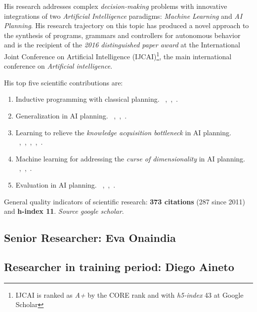 \documentclass[10pt,a4paper]{paper}
\begin{document}
His research addresses complex {\em decision-making} problems with innovative integrations of two {\em Artificial Intelligence} paradigms: {\em Machine Learning} and {\em AI Planning}. His research trajectory on this topic has produced a novel approach to the synthesis of programs, grammars and controllers for autonomous behavior and is the recipient of the {\it 2016 distinguished paper award} at the International Joint Conference on Artificial Intelligence (IJCAI)\footnote{IJCAI is ranked as {\it A+} by the CORE rank and with {\it h5-index} 43 at Google Scholar}, the main international conference on {\em Artificial intelligence}.

His top five scientific contributions are:
\begin{enumerate}
\item Inductive programming with classical planning. {\footnotesize~\cite{javi-ijcai17},~\cite{segovia2016generalized},~\cite{jimenez2015computing}}.
\item Generalization in AI planning. {\footnotesize~\cite{javi-icaps17},~\cite{damir-derived-ijcai16},~\cite{javi-fsc-ijcai16}}.
\item Learning to relieve the {\it knowledge acquisition bottleneck} in AI planning. {\footnotesize{~\cite{diego-icaps18},~\cite{jimenez2013integrating},~\cite{jimenez2008architecture},~\cite{jimenez2006planning},~\cite{lanchas2007learning}}}.
\item Machine learning for addressing the {\it curse of dimensionality} in AI planning. {\footnotesize~\cite{jimenez2012review},~\cite{de2011scaling},~\cite{de2008learning}}.  
\item Evaluation in AI planning. {\footnotesize~\cite{lopez2015deterministic},~\cite{lopez2013automating},~\cite{coles2012survey}}. 
\end{enumerate}

General quality indicators of scientific research: {\bf 373 citations} (287 since 2011) and {\bf h-index 11}. {\small\em Source google scholar}.


\subsection{Senior Researcher: Eva Onaindia} 

\subsection{Researcher in training period: Diego Aineto}
\end{document}
